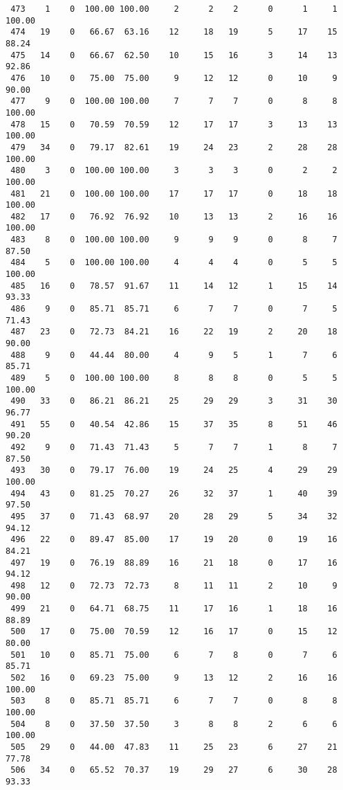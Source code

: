 \begin{verbatim}
 473    1    0  100.00 100.00     2      2    2      0      1     1   100.00
 474   19    0   66.67  63.16    12     18   19      5     17    15    88.24
 475   14    0   66.67  62.50    10     15   16      3     14    13    92.86
 476   10    0   75.00  75.00     9     12   12      0     10     9    90.00
 477    9    0  100.00 100.00     7      7    7      0      8     8   100.00
 478   15    0   70.59  70.59    12     17   17      3     13    13   100.00
 479   34    0   79.17  82.61    19     24   23      2     28    28   100.00
 480    3    0  100.00 100.00     3      3    3      0      2     2   100.00
 481   21    0  100.00 100.00    17     17   17      0     18    18   100.00
 482   17    0   76.92  76.92    10     13   13      2     16    16   100.00
 483    8    0  100.00 100.00     9      9    9      0      8     7    87.50
 484    5    0  100.00 100.00     4      4    4      0      5     5   100.00
 485   16    0   78.57  91.67    11     14   12      1     15    14    93.33
 486    9    0   85.71  85.71     6      7    7      0      7     5    71.43
 487   23    0   72.73  84.21    16     22   19      2     20    18    90.00
 488    9    0   44.44  80.00     4      9    5      1      7     6    85.71
 489    5    0  100.00 100.00     8      8    8      0      5     5   100.00
 490   33    0   86.21  86.21    25     29   29      3     31    30    96.77
 491   55    0   40.54  42.86    15     37   35      8     51    46    90.20
 492    9    0   71.43  71.43     5      7    7      1      8     7    87.50
 493   30    0   79.17  76.00    19     24   25      4     29    29   100.00
 494   43    0   81.25  70.27    26     32   37      1     40    39    97.50
 495   37    0   71.43  68.97    20     28   29      5     34    32    94.12
 496   22    0   89.47  85.00    17     19   20      0     19    16    84.21
 497   19    0   76.19  88.89    16     21   18      0     17    16    94.12
 498   12    0   72.73  72.73     8     11   11      2     10     9    90.00
 499   21    0   64.71  68.75    11     17   16      1     18    16    88.89
 500   17    0   75.00  70.59    12     16   17      0     15    12    80.00
 501   10    0   85.71  75.00     6      7    8      0      7     6    85.71
 502   16    0   69.23  75.00     9     13   12      2     16    16   100.00
 503    8    0   85.71  85.71     6      7    7      0      8     8   100.00
 504    8    0   37.50  37.50     3      8    8      2      6     6   100.00
 505   29    0   44.00  47.83    11     25   23      6     27    21    77.78
 506   34    0   65.52  70.37    19     29   27      6     30    28    93.33

\end{verbatim}
